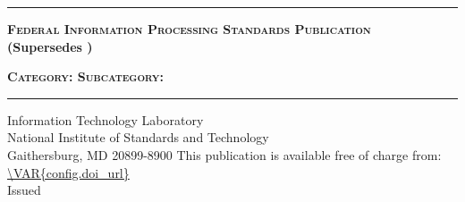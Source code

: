 \documentclass[12pt]{article}
\begin{document}
    \RaggedRight %


\begin{titlepage}


\sffamily

\LARGE{\textbf{}}
\vspace{8pt}
\hrule
\vspace{8pt}
\large{\textbf{\textsc{Federal Information Processing Standards Publication}}}\\
\small{\textbf{(Supersedes )}}

\vfill
\huge{\textbf{}}
\vfill
\normalsize{\textbf{\textsc{Category: 
\hfill Subcategory: }}}
\vspace{8pt}
\hrule
\vfill

Information Technology Laboratory\\
National Institute of Standards and Technology\\
Gaithersburg, MD 20899-8900
\vfill
\normalsize This publication is available free of charge from:\\
\url{\VAR{config.doi_url}}\\
\vfill
\normalsize Issued 
\vfill


\end{titlepage}
\end{document}

